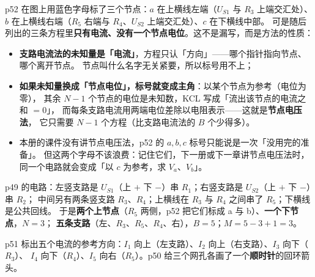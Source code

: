 \documentclass[11pt]{ctexart}
\begin{document}

p52 在图上用蓝色字母标了三个节点：$a$ 在上横线左端（$U_{S1}$ 与 $R_3$ 上端交汇处）、
$b$ 在上横线右端（$R_5$ 右端与 $R_4$、$U_{S2}$ 上端交汇处）、$c$ 在下横线中部。
可是随后列出的三条方程里\textbf{只有电流、没有一个节点电位}。这不是漏写，而是方法的性质：

\begin{itemize}
\item \textbf{支路电流法的未知量是「电流」}，方程只认「方向」——哪个指针指向节点、哪个离开节点。
节点叫什么名字无关紧要，所以标号用不上；
\item \textbf{如果未知量换成「节点电位」，标号就变成主角}：以某个节点为参考（电位为零），
其余 $N-1$ 个节点的电位是未知数，KCL 写成「流出该节点的电流之和 $=0$」，
而每条支路电流用两端电位差除以电阻表示——这就是\textbf{节点电压法}，
它只需要 $N-1$ 个方程（比支路电流法的 $B$ 个少得多）。
\item 本册的课件没有讲节点电压法，p52 的 $a,b,c$ 标号只能说是一次「没用完的准备」。
但这两个字母不该浪费：记住它们，下一册或下一章讲节点电压法时，
同一个电路就会变成「以 $c$ 为参考，求 $V_a$、$V_b$」。
\end{itemize}




p49 的电路：左竖支路是 $U_{S1}$（上 $+$ 下 $-$）串 $R_1$；右竖支路是 $U_{S2}$（上 $+$ 下 $-$）串 $R_2$；
中间另有两条竖支路 $R_3$、$R_4$；上横线在 $R_3$ 与 $R_4$ 之间串了 $R_5$；下横线是公共回线。
于是\textbf{两个上节点}（$R_5$ 两侧，p52 把它们标成 a 与 b）、\textbf{一个下节点}，$N=3$；
\textbf{五条支路}（左、$R_3$、$R_5$、$R_4$、右），$B=5$；$M=5-3+1=3$。

p51 标出五个电流的参考方向：$I_1$ 向上（左支路）、$I_2$ 向上（右支路）、$I_3$ 向下（$R_3$）、
$I_4$ 向下（$R_4$）、$I_5$ 向右（$R_5$）。p50 给三个网孔各画了一个\textbf{顺时针}的回环箭头。
\end{document}

